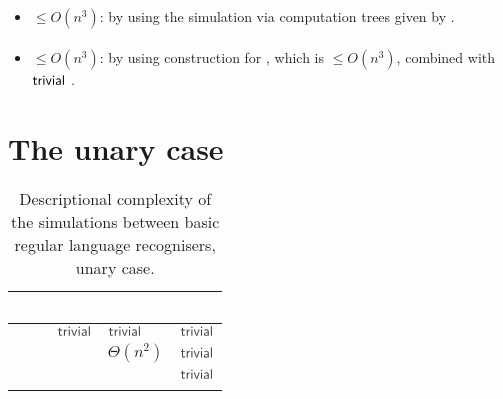 \paragraph{\OMODLA{}\tto\TDFA}\label{cost:OM1DLAto2DFA}
\begin{itemize}
	\item $\le O(n^3)$: by using the simulation via computation trees given by .
\end{itemize}
\paragraph{\OMODLA{}\tto\TNFA}
\begin{itemize}
	\item $\le O(n^3)$: by using construction for \hyperref[cost:OM1DLAto2DFA]{\OMODLA{}\tto\TDFA}, which is $\le O(n^3)$, combined with $\mathsf{trivial}$ \TDFA{}\tto\TNFA.
\end{itemize}



\section{The unary case}\label{sec:prevsims-unary}

\begin{table}
	\centering
	\renewcommand{\arraystretch}{1.2}
	\begin{tabular}{|l|l|l|p{4.3em}|l|}
		\hline
		~     & \ODFA           & \ONFA           & \TDFA                                            & \TNFA     \\ \hline
		\ODFA & \cY             & $\Cctriv$       & $\Cctriv$                                        & $\Cctriv$ \\ \hline
		\ONFA & \rbt{$\CsubEq$} & \cY             & \cR $\Theta(n^2)$                                & $\Cctriv$ \\ \hline
		\TDFA & \rbt{$\CsubEq$} & \rbt{$\CsubEq$} & \cY                                              & $\Cctriv$ \\ \hline
		\TNFA & \rbt{$\CsubEq$} & \rbt{$\CsubEq$} & \cR \rbt[.4]{$\le\Csubln$} \rbt[.3]{$\ge\Cpoly$} & \cY       \\ \hline
	\end{tabular}
	\caption{Descriptional complexity of the simulations between basic regular language recognisers, unary case.}
	\label{tab:sims-core-unary}
\end{table}

